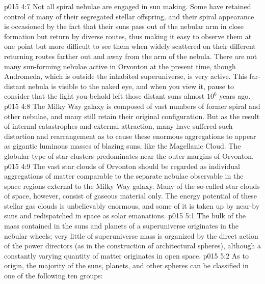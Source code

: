 \vs p015 4:7 Not all spiral nebulae are engaged in sun making. Some have retained control of many of their segregated stellar offspring, and their spiral appearance is occasioned by the fact that their suns pass out of the nebular arm in close formation but return by diverse routes, thus making it easy to observe them at one point but more difficult to see them when widely scattered on their different returning routes farther out and away from the arm of the nebula. There are not many sun\hyp{}forming nebulae active in Orvonton at the present time, though Andromeda, which is outside the inhabited superuniverse, is very active. This far\hyp{}distant nebula is visible to the naked eye, and when you view it, pause to consider that the light you behold left those distant suns almost $10^6$ years ago.
\vs p015 4:8 The Milky Way galaxy is composed of vast numbers of former spiral and other nebulae, and many still retain their original configuration. But as the result of internal catastrophes and external attraction, many have suffered such distortion and rearrangement as to cause these enormous aggregations to appear as gigantic luminous masses of blazing suns, like the Magellanic Cloud. The globular type of star clusters predominates near the outer margins of Orvonton.
\vs p015 4:9 The vast star clouds of Orvonton should be regarded as individual aggregations of matter comparable to the separate nebulae observable in the space regions external to the Milky Way galaxy. Many of the so\hyp{}called star clouds of space, however, consist of gaseous material only. The energy potential of these stellar gas clouds is unbelievably enormous, and some of it is taken up by near\hyp{}by suns and redispatched in space as solar emanations.
\vs p015 5:1 The bulk of the mass contained in the suns and planets of a superuniverse originates in the nebular wheels; very little of superuniverse mass is organized by the direct action of the power directors (as in the construction of architectural spheres), although a constantly varying quantity of matter originates in open space.
\vs p015 5:2 As to origin, the majority of the suns, planets, and other spheres can be classified in one of the following ten groups:
